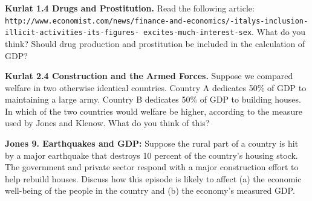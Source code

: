 \noindent\textbf{Kurlat 1.4 Drugs and Prostitution.} Read the following article:
\texttt{http://\allowbreak www.economist.com/\allowbreak news/\allowbreak finance-\allowbreak and-\allowbreak economics/-\allowbreak italys-\allowbreak inclusion-\allowbreak illicit-\allowbreak activities-\allowbreak its-\allowbreak figures-\allowbreak
excites-\allowbreak much-\allowbreak interest-\allowbreak sex}. What do you think? Should drug
production and prostitution be included in the calculation of GDP?

\noindent\textbf{Kurlat 2.4 Construction and the Armed Forces.} Suppose we compared welfare in two otherwise identical countries.
Country A dedicates 50\% of GDP to maintaining a large army. Country B dedicates 50\% of GDP to building houses. In which of the
two countries would welfare be higher, according to the measure used by Jones and Klenow. What do you think of this?

\noindent\textbf{Jones 9. Earthquakes and GDP:} Suppose the rural part of a country is hit by a major earthquake that destroys
10 percent of the country's housing stock. The government and private sector respond with a major construction effort to help
rebuild houses. Discuss how this episode is likely to affect (a) the economic well-being of the people in the country and (b) the
economy's measured GDP.

